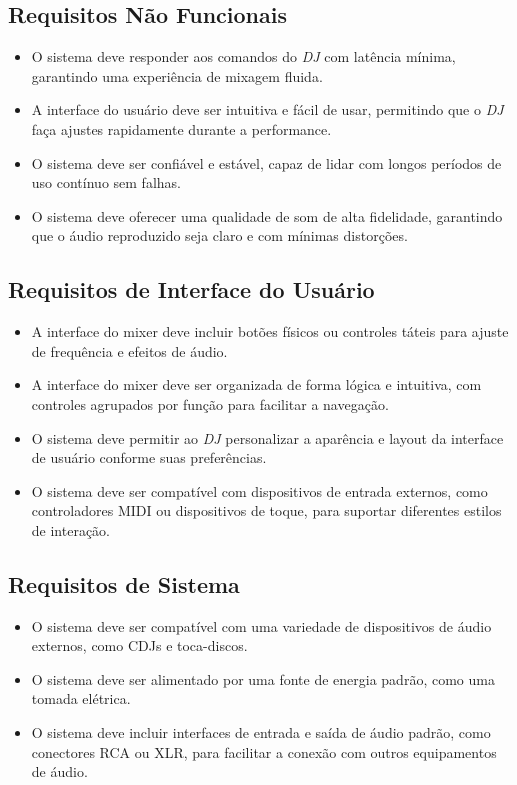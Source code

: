 \subsection{Requisitos Não Funcionais}
\begin{itemize}
    \item O sistema deve responder aos comandos do \textit{DJ} com latência mínima, garantindo uma experiência de mixagem fluida.
    \item A interface do usuário deve ser intuitiva e fácil de usar, permitindo que o \textit{DJ} faça ajustes rapidamente durante a performance.
    \item O sistema deve ser confiável e estável, capaz de lidar com longos períodos de uso contínuo sem falhas.
    \item O sistema deve oferecer uma qualidade de som de alta fidelidade, garantindo que o áudio reproduzido seja claro e com mínimas distorções.
\end{itemize}

\subsection{Requisitos de Interface do Usuário}
\begin{itemize}
    \item A interface do mixer deve incluir botões físicos ou controles táteis para ajuste de frequência e efeitos de áudio.
    \item A interface do mixer deve ser organizada de forma lógica e intuitiva, com controles agrupados por função para facilitar a navegação.
    \item O sistema deve permitir ao \textit{DJ} personalizar a aparência e layout da interface de usuário conforme suas preferências.
    \item O sistema deve ser compatível com dispositivos de entrada externos, como controladores MIDI ou dispositivos de toque, para suportar diferentes estilos de interação.
\end{itemize}

\subsection{Requisitos de Sistema}
\begin{itemize}
    \item O sistema deve ser compatível com uma variedade de dispositivos de áudio externos, como CDJs e toca-discos.
    \item O sistema deve ser alimentado por uma fonte de energia padrão, como uma tomada elétrica.
    \item O sistema deve incluir interfaces de entrada e saída de áudio padrão, como conectores RCA ou XLR, para facilitar a conexão com outros equipamentos de áudio.
\end{itemize}

